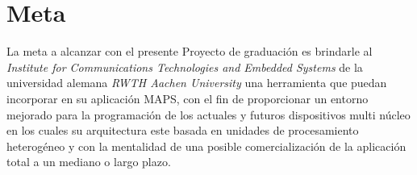 
\chapter{Meta}
\label{ch:Meta}

La meta a alcanzar con el presente Proyecto de graduación es brindarle 
al \textit{Institute for Communications Technologies and Embedded Systems}
de la universidad alemana \textit{RWTH Aachen University} una herramienta 
que puedan incorporar en su aplicación MAPS, con el fin de proporcionar 
un entorno mejorado para la programación de los actuales y futuros dispositivos 
multi núcleo en los cuales su arquitectura este basada en unidades de procesamiento
heterogéneo y con la mentalidad de una posible comercialización de la aplicación 
total a un mediano o largo plazo.
